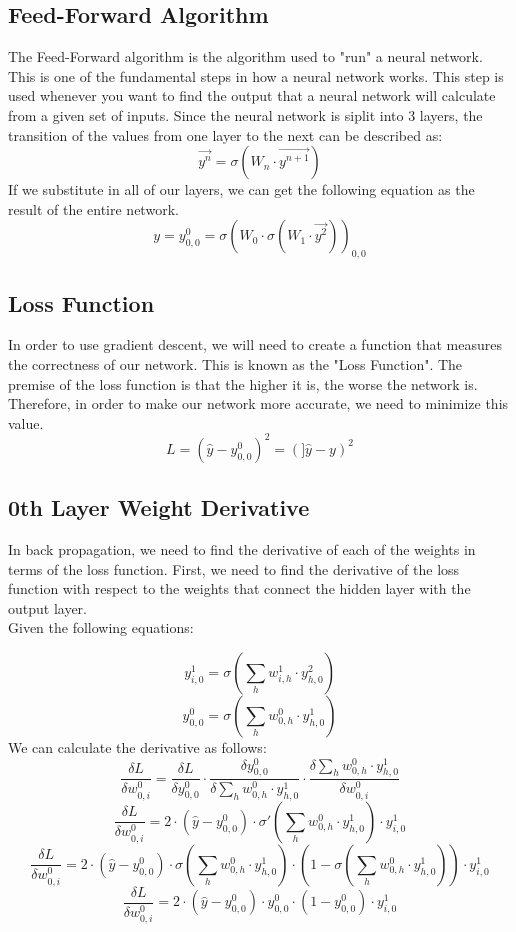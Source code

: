 \documentclass[10pt]{article}
\begin{document}
\subsection{Feed-Forward Algorithm}
The Feed-Forward algorithm is the algorithm used to "run" a neural network. This is one of the fundamental steps in how a neural network works. This step is used whenever you want to find the output that a neural network will calculate from a given set of inputs. Since the neural network is siplit into 3 layers, the transition of the values from one layer to the next can be described as:
$$\vec{y^n} = \sigma(W_{n} \cdot \vec{y^{n+1}})$$
If we substitute in all of our layers, we can get the following equation as the result of the entire network.
$$y = y^0_{0,0} = \sigma(W_0 \cdot \sigma(W_1 \cdot \vec{y^2}))_{0,0}$$
\subsection{Loss Function}
In order to use gradient descent, we will need to create a function that measures the correctness of our network. This is known as the "Loss Function". The premise of the loss function is that the higher it is, the worse the network is. Therefore, in order to make our network more accurate, we need to minimize this value.
$$L = (\hat{y} - y^0_{0,0})^2 = (]\hat{y} - y)^2$$

\subsection{0th Layer Weight Derivative}

In back propagation, we need to find the derivative of each of the weights in terms of the loss function. First, we need to find the derivative of the loss function with respect to the weights that connect the hidden layer with the output layer.\\
Given the following equations:

$$y^1_{i,0} = \sigma(\sum_h{w^1_{i,h} \cdot y^2_{h,0}})$$
$$y^0_{0,0} = \sigma(\sum_h{w^0_{0,h} \cdot y^1_{h,0}})$$
We can calculate the derivative as follows:
$$\frac{\delta L}{\delta w^0_{0,i}} = \frac{\delta L}{\delta y^0_{0,0}} \cdot \frac{\delta y^0_{0,0}}{\delta \sum_h{w^0_{0,h} \cdot y^1_{h,0}}} \cdot \frac{\delta \sum_h{w^0_{0,h} \cdot y^1_{h,0}}}{\delta w^0_{0,i}}$$
$$\frac{\delta L}{\delta w^0_{0,i}} = 2 \cdot (\hat{y} - y^0_{0,0}) \cdot \sigma'(\sum_h{w^0_{0,h} \cdot y^1_{h,0}}) \cdot y^1_{i,0}$$
$$\frac{\delta L}{\delta w^0_{0,i}} = 2 \cdot (\hat{y} - y^0_{0,0}) \cdot \sigma(\sum_h{w^0_{0,h} \cdot y^1_{h,0}}) \cdot (1 - \sigma(\sum_h{w^0_{0,h} \cdot y^1_{h,0}})) \cdot y^1_{i,0}$$
$$\frac{\delta L}{\delta w^0_{0,i}} = 2\cdot (\hat{y} - y^0_{0,0}) \cdot y^0_{0,0} \cdot (1 - y^0_{0,0}) \cdot y^1_{i,0}$$
\end{document}
